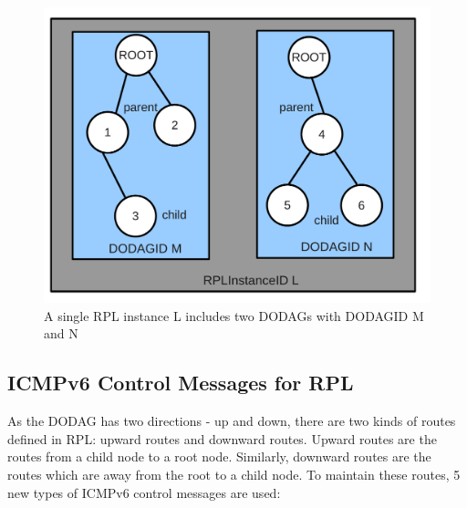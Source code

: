 \begin{figure}[htbp]
  \begin{center}
    \leavevmode
      \includegraphics[scale=0.25]{Pics/InstanceID.pdf}
    \caption{A single RPL instance L includes two DODAGs with DODAGID M and N}
    \label{fig:InstanceID}
  \end{center}
\end{figure}

\subsection{ICMPv6 Control Messages for RPL}
\label{RPL:ICMP}

As the DODAG has two directions - up and down, there are two kinds of routes defined in RPL: upward routes and downward routes. Upward routes are the routes from a child node to a root node. Similarly, downward routes are the routes which are away from the root to a child node. To maintain these routes, 5 new types of ICMPv6 control messages are used:

